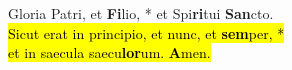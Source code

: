 Gloria Patri, et \textbf{Fi}lio, * et Spi\textbf{ri}tui \textbf{San}cto. \\
\hl{Sicut erat in principio, et nunc, et \textbf{sem}per, *\\
et in saecula saecu\textbf{lor}um. \textbf{A}men.}

